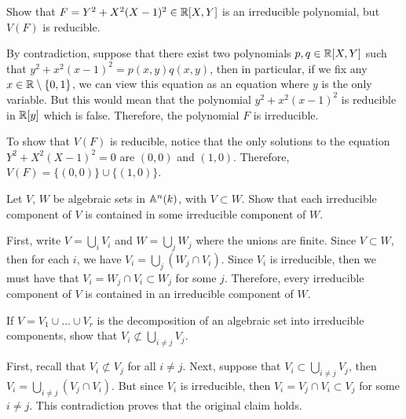 \begin{exercise}
    Show that $F = Y^2 + X^2(X-1)^2 \in \mathbb{R}[X,Y]$ is an irreducible polynomial, but $V(F)$ is reducible. \\
\end{exercise}

\begin{solution}
    By contradiction, suppose that there exist two polynomials $p, q \in \mathbb{R}[X,Y]$ such that $y^2 + x^2(x-1)^2 = p(x,y)q(x,y)$, then in particular, if we fix any $x \in \mathbb{R} \setminus \{0,1\}$, we can view this equation as an equation where $y$ is the only variable. But this would mean that the polynomial $y^2 + x^2(x-1)^2$ is reducible in $\mathbb{R}[y]$ which is false. Therefore, the polynomial $F$ is irreducible.
    
    To show that $V(F)$ is reducible, notice that the only solutions to the equation $Y^2 + X^2(X-1)^2 = 0$ are $(0,0)$ and $(1,0)$. Therefore, $V(F) = \{(0,0)\} \cup \{(1,0)\}$. \\
\end{solution}

\begin{exercise}
    Let $V$, $W$ be algebraic sets in $\mathbb{A}^n(k)$, with $V \subset W$. Show that each irreducible component of $V$ is contained in some irreducible component of $W$. \\
\end{exercise}

\begin{solution}
    First, write $V = \bigcup_i V_i$ and $W = \bigcup_j W_j$ where the unions are finite. Since $V \subset W$, then for each $i$, we have $V_i = \bigcup_j(W_j \cap V_i)$. Since $V_i$ is irreducible, then we must have that $V_i = W_j \cap V_i \subset W_j$ for some $j$. Therefore, every irreducible component of $V$ is contained in an irreducible component of $W$. \\
\end{solution}

\begin{exercise}
    If $V = V_1 \cup \dots \cup V_r$ is the decomposition of an algebraic set into irreducible components, show that $V_i \not\subset \bigcup_{i \neq j}V_j$. \\
\end{exercise}

\begin{solution}
    First, recall that $V_i \not\subset V_j$ for all $i \neq j$. Next, suppose that $V_i \subset \bigcup_{i \neq j}V_j$, then $V_i = \bigcup_{i \neq j}(V_j \cap V_i)$. But since $V_i$ is irreducible, then $V_i = V_j \cap V_i \subset V_j$ for some $i \neq j$. This contradiction proves that the original claim holds. \\
\end{solution}


